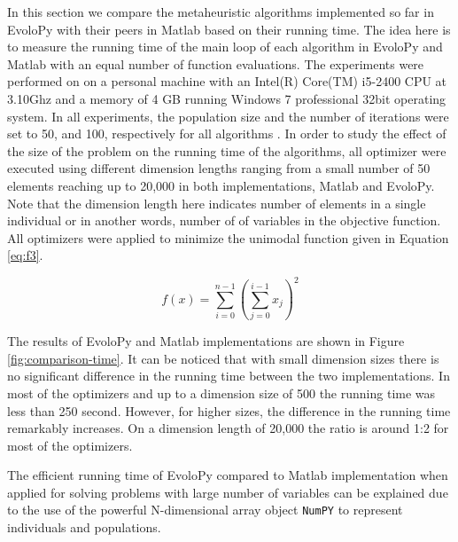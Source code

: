 \documentclass[a4paper,twoside]{article}
\begin{document}
In this section we compare the metaheuristic algorithms implemented so far in EvoloPy with their peers in Matlab based on their running time. The idea here is to measure the running time of the main loop of each algorithm in EvoloPy and Matlab with an equal number of function evaluations. The experiments were performed on on a personal machine with an  Intel(R) Core(TM) i5-2400 CPU at 3.10Ghz and a memory of 4 GB running Windows 7 professional 32bit operating system. In all experiments, the population size and the number of iterations were set to 50, and 100, respectively for all algorithms . In order to study the effect of the size of the problem on the running time of the algorithms, all optimizer were executed using different dimension lengths ranging from a small number of 50 elements reaching up to 20,000 in both implementations, Matlab and EvoloPy. Note that the dimension length here indicates number of elements in a single individual or in another words, number of of variables in the objective function. All optimizers were applied to minimize the unimodal function given in Equation \ref{eq:f3}. 



\begin{equation}
f(x)=\sum_{i=0}^{n-1}(\sum_{j=0}^{i-1}x_{j})^{2}
\label{eq:f3}
\end{equation}

The results of EvoloPy and Matlab implementations are shown in Figure \ref{fig:comparison-time}. It can be noticed that with small dimension sizes there is no significant difference in the running time between the two implementations. In most of the optimizers and up to a dimension size of 500  the running time was less than 250 second. However, for higher sizes, the difference in the running time  remarkably increases. On a dimension length of 20,000 the ratio is around 1:2 for most of the optimizers.

The efficient running time of EvoloPy compared to Matlab implementation when applied for solving problems with large number of variables can be explained due to the use of the powerful N-dimensional array object \texttt{NumPY} to represent individuals and populations.
\end{document}
